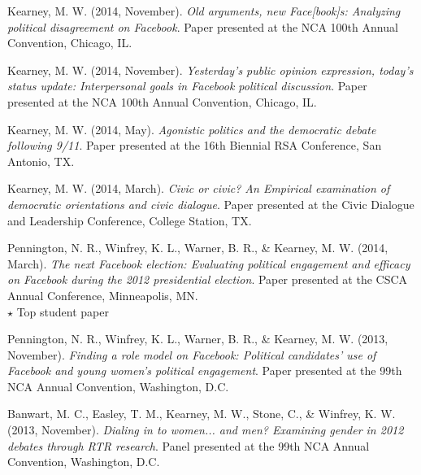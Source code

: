 \documentclass[11pt,letterpaper]{article}
\begin{document}
\begin{bibenum}
    \item[] Kearney, M. W. (2014, November).
      \textit{Old arguments, new Face[book]s: Analyzing political
      disagreement on Facebook}.
      Paper presented at the NCA 100th Annual Convention, Chicago, IL.

    \item[] Kearney, M. W. (2014, November).
      \textit{Yesterday's public opinion expression, today's status update:
      Interpersonal goals in Facebook political discussion}.
      Paper presented at the NCA 100th Annual Convention, Chicago, IL.

    \item[] Kearney, M. W. (2014, May).
      \textit{Agonistic politics and the democratic debate following 9/11}.
      Paper presented at the 16th Biennial RSA Conference, San Antonio,
      TX.

    \item[] Kearney, M. W. (2014, March).
      \textit{Civic or civic? An Empirical examination of democratic
      orientations and civic dialogue}.
      Paper presented at the Civic Dialogue and Leadership Conference,
      College Station, TX.

    \item[] Pennington, N. R., Winfrey, K. L., Warner, B. R., \& Kearney,
      M. W. (2014, March).
      \textit{The next Facebook election: Evaluating political engagement and
      efficacy on Facebook during the 2012 presidential election}.
      Paper presented at the CSCA Annual Conference, Minneapolis, MN.\\
      {$\star$} Top student paper

    \item[] Pennington, N. R., Winfrey, K. L., Warner, B. R., \& Kearney,
      M. W. (2013, November).
      \textit{Finding a role model on Facebook: Political candidates' use of
      Facebook and young women's political engagement}.
      Paper presented at the 99th NCA Annual Convention, Washington, D.C.

    \item[] Banwart, M. C., Easley, T. M., Kearney, M. W., Stone, C., \&
      Winfrey, K. W. (2013, November).
      \textit{Dialing in to women... and men? Examining gender in 2012
      debates through RTR research}.
      Panel presented at the 99th NCA Annual Convention, Washington, D.C.
  \end{bibenum}
\end{document}
